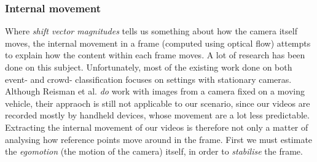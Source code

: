 \subsubsection{Internal movement}\label{sec:opticalflowdata}
%
Where \textit{shift vector magnitudes} tells us something about how the camera itself moves, the internal movement in a frame (computed using optical flow) attempts to explain how the content within each frame moves. A lot of research has been done on this subject. Unfortunately, most of the existing work done on both event- and crowd- classification focuses on settings with stationary cameras. Although Reisman et al. \cite{CrowdDetectionInVideoSequences} \textit{do} work with images from a camera fixed on a moving vehicle, their appraoch is still not applicable to our scenario, since our videos are recorded mostly by handheld devices, whose movement are a lot less predictable. Extracting the internal movement of our videos is therefore not only a matter of analysing how reference points move around in the frame. First we must estimate the \textit{egomotion} (the motion of the camera) itself, in order to \textit{stabilise} the frame.
%
